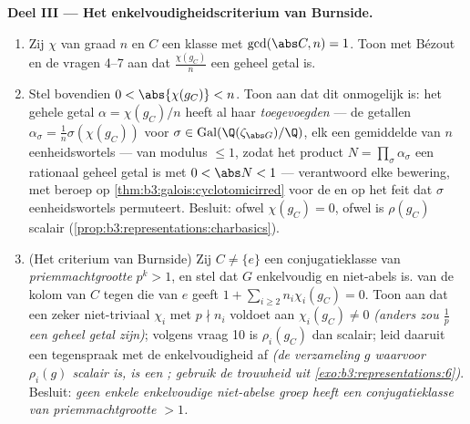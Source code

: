 \begin{problem}
\medskip
\noindent\textbf{Deel III --- Het enkelvoudigheidscriterium van
Burnside.}
\begin{enumerate}[resume]
  \item Zij $\chi$  van graad $n$ en $C$ een klasse met
        $\gcd(\abs C, n) = 1$. Toon met Bézout en de vragen 4--7
        aan dat $\frac{\chi(g_C)}{n}$ een geheel  getal
        is.
  \item Stel bovendien $0 < \abs{\chi(g_C)} < n$. Toon aan dat dit
        onmogelijk is: het gehele  getal $\alpha =
        \chi(g_C)/n$ heeft al haar \emph{toegevoegden} --- de
        getallen $\alpha_\sigma = \frac1n\sigma(\chi(g_C))$ voor
        $\sigma \in \operatorname{Gal}(\Q(\zeta_{\abs G})/\Q)$,
        elk een gemiddelde van $n$ eenheidswortels --- van modulus
        $\leq 1$, zodat het product $N = \prod_\sigma\alpha_\sigma$
        een rationaal geheel  getal is met $0 < \abs N
        < 1$ --- verantwoord elke bewering, met beroep op
        \cref{thm:b3:galois:cyclotomicirred} voor de 
        en op het feit dat $\sigma$ eenheidswortels permuteert.
        Besluit: ofwel $\chi(g_C) = 0$, ofwel is $\rho(g_C)$
        scalair (\cref{prop:b3:representations:charbasics}).
  \item (Het criterium van Burnside) Zij $C \neq \{e\}$ een
        conjugatieklasse van \emph{priemmachtgrootte} $p^k > 1$,
        en stel dat $G$ enkelvoudig en niet-abels is.
         van de kolom van $C$ tegen die van
        $e$ geeft $1 + \sum_{i \geq 2} n_i\chi_i(g_C) = 0$. Toon
        aan dat een zeker niet-triviaal $\chi_i$ met $p \nmid n_i$
        voldoet aan $\chi_i(g_C) \neq 0$ \emph{(anders zou
        $\frac1p$ een geheel  getal zijn)}; volgens
        vraag 10 is $\rho_i(g_C)$ dan scalair; leid daaruit een
        tegenspraak met de enkelvoudigheid af \emph{(de
        verzameling $g$ waarvoor $\rho_i(g)$ scalair is, is een
        ; gebruik de trouwheid uit
        \cref{exo:b3:representations:6})}. Besluit: \emph{geen
        enkele enkelvoudige niet-abelse groep heeft een
        conjugatieklasse van priemmachtgrootte $> 1$.}
\end{enumerate}


\end{problem}
